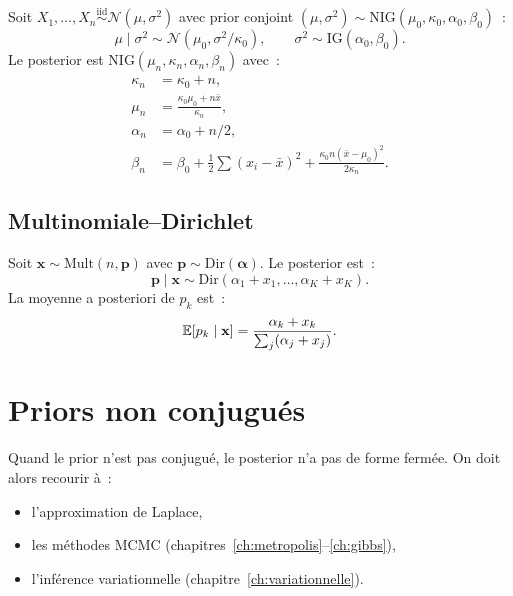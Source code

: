 \begin{theoreme}
Soit $X_1, \ldots, X_n \overset{\text{iid}}{\sim} \mathcal{N}(\mu, \sigma^2)$
avec prior conjoint $(\mu, \sigma^2) \sim \text{NIG}(\mu_0, \kappa_0, \alpha_0, \beta_0)$~:
\[
  \mu \mid \sigma^2 \sim \mathcal{N}(\mu_0, \sigma^2/\kappa_0), \qquad
  \sigma^2 \sim \text{IG}(\alpha_0, \beta_0).
\]
Le posterior est $\text{NIG}(\mu_n, \kappa_n, \alpha_n, \beta_n)$ avec~:
\begin{align*}
  \kappa_n &= \kappa_0 + n, \\
  \mu_n &= \frac{\kappa_0 \mu_0 + n\bar{x}}{\kappa_n}, \\
  \alpha_n &= \alpha_0 + n/2, \\
  \beta_n &= \beta_0 + \tfrac{1}{2}\sum(x_i-\bar{x})^2
  + \frac{\kappa_0 n(\bar{x}-\mu_0)^2}{2\kappa_n}.
\end{align*}
\end{theoreme}

\subsection{Multinomiale--Dirichlet}

\begin{exemple}
Soit $\mathbf{x} \sim \text{Mult}(n, \mathbf{p})$ avec
$\mathbf{p} \sim \text{Dir}(\boldsymbol{\alpha})$. Le posterior est~:
\[
  \mathbf{p} \mid \mathbf{x} \sim \text{Dir}(\alpha_1 + x_1, \ldots, \alpha_K + x_K).
\]
La moyenne a posteriori de $p_k$ est~:
\[
  \mathbb{E}[p_k \mid \mathbf{x}] = \frac{\alpha_k + x_k}{\sum_j (\alpha_j + x_j)}.
\]
\end{exemple}

\section{Priors non conjugu\'es}

\begin{remarque}
Quand le prior n'est pas conjugu\'e, le posterior n'a pas de forme
ferm\'ee. On doit alors recourir \`a~:
\begin{itemize}
  \item l'approximation de Laplace,
  \item les m\'ethodes MCMC (chapitres~\ref{ch:metropolis}--\ref{ch:gibbs}),
  \item l'inf\'erence variationnelle (chapitre~\ref{ch:variationnelle}).
\end{itemize}
\end{remarque}

